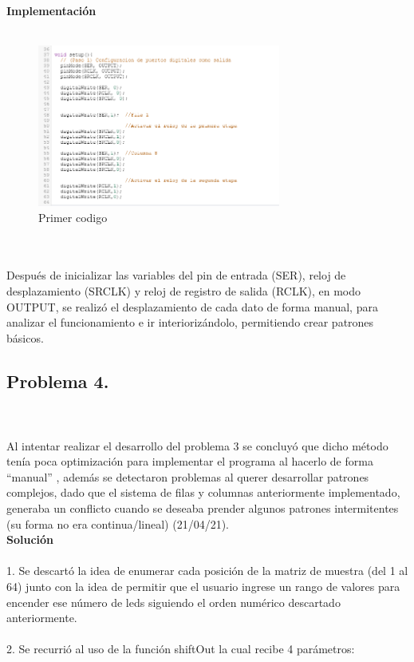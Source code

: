 \documentclass{article}
\begin{document}
\textbf{\large Implementación}\\\\
\begin{figure}[h]
    \includegraphics[width=8cm]{Imagen3.png}
    \centering
    \caption{Primer codigo}
    \label{fig:Imagen3}
\end{figure}\\\\

Después de inicializar las variables del pin de entrada (SER), reloj de desplazamiento (SRCLK) y reloj de registro de salida (RCLK), en modo OUTPUT, se realizó el desplazamiento de cada dato de forma manual, para analizar el funcionamiento e ir interiorizándolo, permitiendo crear patrones básicos.\\

\subsection{\large Problema 4.}\\\\
Al intentar realizar el desarrollo del problema 3 se concluyó que dicho método tenía poca optimización para implementar el programa al hacerlo de forma “manual” , además se detectaron problemas al querer desarrollar patrones complejos, dado que el sistema de filas y columnas anteriormente implementado, generaba un conflicto cuando se deseaba prender algunos patrones intermitentes (su forma no era continua/lineal) (21/04/21). \\

\textbf{\large Solución}\\\\
1. Se descartó la idea de enumerar cada posición de la matriz de muestra (del 1 al 64) junto con la idea de permitir que el usuario ingrese un rango de valores para encender ese número de leds siguiendo el orden numérico descartado anteriormente.\\\\
2. Se recurrió al uso de la función shiftOut \cite{arduino} la cual recibe 4 parámetros:\\
\end{document}
